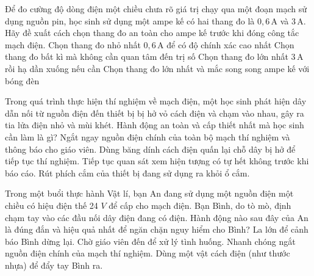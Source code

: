 \begin{ex}
Để đo cường độ dòng điện một chiều chưa rõ giá trị chạy qua một đoạn mạch sử dụng nguồn pin, học sinh sử dụng một ampe kế có hai thang đo là $0,6\,\mathrm{A}$ và $3\,\mathrm{A}$. Hãy đề xuất cách chọn thang đo an toàn cho ampe kế trước khi đóng công tắc mạch điện.
\choice
{Chọn thang đo nhỏ nhất $0,6\,\mathrm{A}$ để có độ chính xác cao nhất}
{Chọn thang đo bất kì mà không cần quan tâm đến trị số}
{\True Chọn thang đo lớn nhất $3\,\mathrm{A}$ rồi hạ dần xuống nếu cần}
{Chọn thang đo lớn nhất và mắc song song ampe kế với bóng đèn}
\end{ex}

\begin{ex}
Trong quá trình thực hiện thí nghiệm về mạch điện, một học sinh phát hiện dây dẫn nối từ nguồn điện đến thiết bị bị hở vỏ cách điện và chạm vào nhau, gây ra tia lửa điện nhỏ và mùi khét. Hành động an toàn và cấp thiết nhất mà học sinh cần làm là gì?
\choice
{\True Ngắt ngay nguồn điện chính của toàn bộ mạch thí nghiệm và thông báo cho giáo viên.}
{Dùng băng dính cách điện quấn lại chỗ dây bị hở để tiếp tục thí nghiệm.}
{Tiếp tục quan sát xem hiện tượng có tự hết không trước khi báo cáo.}
{Rút phích cắm của thiết bị đang sử dụng ra khỏi ổ cắm.}
\end{ex}

\begin{ex}
Trong một buổi thực hành Vật lí, bạn An đang sử dụng một nguồn điện một chiều có hiệu điện thế 24 $V$ để cấp cho mạch điện. Bạn Bình, do tò mò, định chạm tay vào các đầu nối dây điện đang có điện. Hành động nào sau đây của An là đúng đắn và hiệu quả nhất để ngăn chặn nguy hiểm cho Bình?
\choice
{La lớn để cảnh báo Bình dừng lại.}
{Chờ giáo viên đến để xử lý tình huống.}
{\True Nhanh chóng ngắt nguồn điện chính của mạch thí nghiệm.}
{Dùng một vật cách điện (như thước nhựa) để đẩy tay Bình ra.}
\end{ex}

